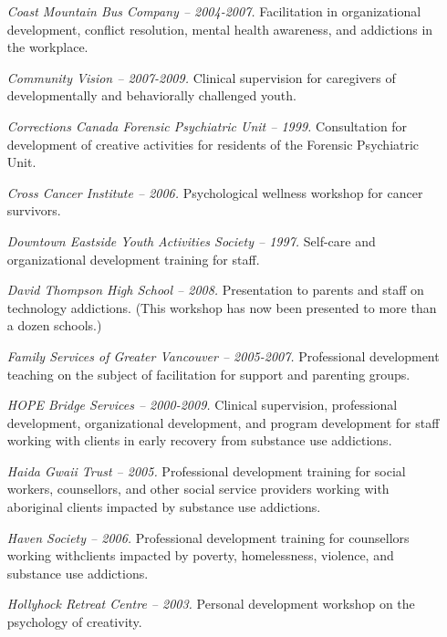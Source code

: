\documentclass[10pt,DIV09,letterpaper,oneside,headsepline]{scrreprt}
\begin{document}
\begin{itemize}
\item [\textit{Coast Mountain Bus Company -- 2004-2007.}]
Facilitation in organizational development, conflict resolution, mental health awareness, and addictions in the workplace.

\item [\textit{Community Vision -- 2007-2009.}]
Clinical supervision for caregivers of developmentally and behaviorally challenged youth.

\item [\textit{Corrections Canada Forensic Psychiatric Unit -- 1999.}]
Consultation for development of creative activities for residents of the Forensic Psychiatric Unit.

\item [\textit{Cross Cancer Institute -- 2006.}]
Psychological wellness workshop for cancer survivors.

\item [\textit{Downtown Eastside Youth Activities Society -- 1997.}]
Self-care and organizational development training for staff.

\item [\textit{David Thompson High School -- 2008.}]
Presentation to parents and staff on technology addictions. (This workshop has now been presented to more than a dozen schools.)

\item [\textit{Family Services of Greater Vancouver -- 2005-2007.}]
Professional development teaching on the subject of facilitation for support and parenting groups.

\item [\textit{HOPE Bridge Services -- 2000-2009.}]
Clinical supervision, professional development, organizational development, and program development for staff working with clients in early recovery from substance use addictions.

\item [\textit{Haida Gwaii Trust -- 2005.}]
Professional development training for social workers, counsellors, and other social service providers working with aboriginal clients impacted by substance use addictions.

\item [\textit{Haven Society -- 2006.}]
Professional development training for counsellors working withclients impacted by poverty, homelessness, violence, and substance use addictions.

\item [\textit{Hollyhock Retreat Centre -- 2003.}]
Personal development workshop on the psychology of creativity.


\end{itemize}
\end{document}
